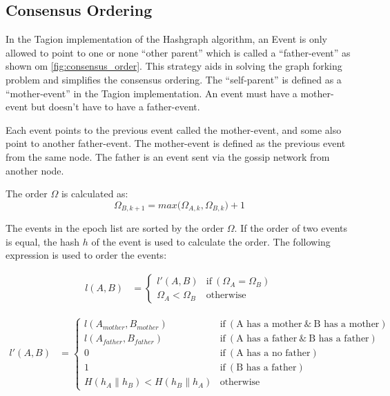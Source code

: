 \subsection{Consensus Ordering}\label{sec:consensus_ordering}
In the Tagion implementation of the Hashgraph algorithm, an Event is only allowed to point to one or none ``other parent'' which is called a ``father-event'' as shown om \cref{fig:consensus_order}. This strategy aids in solving the graph forking problem and simplifies the consensus ordering.
The ``self-parent'' is defined as a ``mother-event'' in the Tagion implementation. An event must have a mother-event but doesn't have to have a father-event.

Each event points to the previous event called the mother-event, and some also point to another father-event. The mother-event is defined as the previous event from the same node. The father is an event sent via the gossip network from another node. 

The order $\Omega$ is calculated as:
\begin{equation}
 \Omega_{B,k+1} = max \big(\Omega_{A,k} , \Omega_{B,k} \big) +1
\end{equation}

The events in the epoch list are sorted by the order $\Omega$. If the order of two events is equal, the hash $h$ of the event is used to calculate the order.
The following expression is used to order the events:

\begin{align}
 {l}(A,B) & = 
    \begin{cases}
         {l'}(A,B) &  	\text{if}  ~ ({\Omega}_{A} = {\Omega}_{B} )  \\ 
        {{\Omega}_{A} < {\Omega}_{B}} & 
        \text{otherwise}
    \end{cases} 
    \label{equ:order}    
\end{align}

\begin{align}
{l'}(A,B) & = 
\begin{cases}
{l}(A_{mother},B_{mother}) &  	
\text{if}  ~ (\text{A has a mother} ~ \&  ~ \text{B has a mother}) \\ 
{l}(A_{father},B_{father}) &  	
\text{if}  ~ (\text{A has a father} ~ \&  ~ \text{B has a father}) \\ 
0 &  	
\text{if}  ~ (\text{A has a no father}) \\ 
1 &  	
\text{if}  ~ (\text{B has a father}) \\ 
H (    {h}_{A} \parallel {h}_{B} )  < H (    {h}_{B} \parallel {h}_{A} ) & 
\text{otherwise}
\end{cases} 
\end{align}



